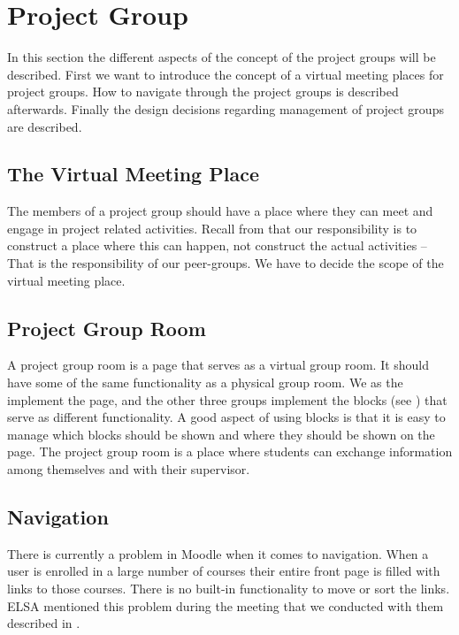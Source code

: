 \section{Project Group}
In this section the different aspects of the concept of the project groups will be described.
First we want to introduce the concept of a virtual meeting places for project groups.
How to navigate through the project groups is described afterwards.
Finally the design decisions regarding management of project groups are described.

\subsection{The Virtual Meeting Place}
The members of a project group should have a place where they can meet and engage in project related activities.
Recall from  that our responsibility is to construct a place where this can happen, not construct the actual activities -- That is the responsibility of our peer-groups.
We have to decide the scope of the virtual meeting place.








\subsection{Project Group Room}
A project group room is a page that serves as a virtual group room. 
It should have some of the same functionality as a physical group room.
We as the \groupname{} implement the page, and the other three groups implement the blocks (see ) that serve as different functionality.
A good aspect of using blocks is that it is easy to manage which blocks should be shown and where they should be shown on the page.
The project group room is a place where students can exchange information among themselves and with their supervisor.


\subsection{Navigation}
There is currently a problem in Moodle when it comes to navigation. 
When a user is enrolled in a large number of courses their entire front page is filled with links to those courses.
There is no built-in functionality to move or sort the links.
ELSA mentioned this problem during the meeting that we conducted with them described in .

